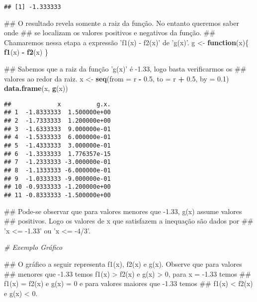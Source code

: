 \documentclass[]{book}
\newenvironment{Shaded}{\begin{snugshade}}{\end{snugshade}}
\newcommand{\KeywordTok}[1]{\textcolor[rgb]{0.13,0.29,0.53}{\textbf{#1}}}
\newcommand{\DataTypeTok}[1]{\textcolor[rgb]{0.13,0.29,0.53}{#1}}
\newcommand{\FloatTok}[1]{\textcolor[rgb]{0.00,0.00,0.81}{#1}}
\newcommand{\StringTok}[1]{\textcolor[rgb]{0.31,0.60,0.02}{#1}}
\newcommand{\CommentTok}[1]{\textcolor[rgb]{0.56,0.35,0.01}{\textit{#1}}}
\newcommand{\ControlFlowTok}[1]{\textcolor[rgb]{0.13,0.29,0.53}{\textbf{#1}}}
\newcommand{\OperatorTok}[1]{\textcolor[rgb]{0.81,0.36,0.00}{\textbf{#1}}}
\newcommand{\NormalTok}[1]{#1}
\begin{document}
\begin{enumerate}
\begin{verbatim}
## [1] -1.333333
\end{verbatim}

\begin{Shaded}
\begin{Highlighting}[]
\NormalTok{##  O resultado revela somente a raiz da função. No entanto queremos saber onde}
\NormalTok{## se localizam os valores positivos e negativos da função.}
\NormalTok{##  Chamaremos nessa etapa a expressão 'f1(x) - f2(x)' de 'g(x)'.}
\NormalTok{g <-}\StringTok{ }\ControlFlowTok{function}\NormalTok{(x)\{}
  \KeywordTok{f1}\NormalTok{(x) }\OperatorTok{-}\StringTok{ }\KeywordTok{f2}\NormalTok{(x)}
\NormalTok{\}}

\NormalTok{##  Sabemos que a raiz da função 'g(x)' é -1.33, logo basta verificarmos os}
\NormalTok{## valores ao redor da raiz.}
\NormalTok{x <-}\StringTok{ }\KeywordTok{seq}\NormalTok{(}\DataTypeTok{from =}\NormalTok{ r }\OperatorTok{-}\StringTok{ }\FloatTok{0.5}\NormalTok{, }\DataTypeTok{to =}\NormalTok{ r }\OperatorTok{+}\StringTok{ }\FloatTok{0.5}\NormalTok{, }\DataTypeTok{by =} \FloatTok{0.1}\NormalTok{)}
\KeywordTok{data.frame}\NormalTok{(x, }\KeywordTok{g}\NormalTok{(x))}
\end{Highlighting}
\end{Shaded}

\begin{verbatim}
##             x          g.x.
## 1  -1.8333333  1.500000e+00
## 2  -1.7333333  1.200000e+00
## 3  -1.6333333  9.000000e-01
## 4  -1.5333333  6.000000e-01
## 5  -1.4333333  3.000000e-01
## 6  -1.3333333  1.776357e-15
## 7  -1.2333333 -3.000000e-01
## 8  -1.1333333 -6.000000e-01
## 9  -1.0333333 -9.000000e-01
## 10 -0.9333333 -1.200000e+00
## 11 -0.8333333 -1.500000e+00
\end{verbatim}

\begin{Shaded}
\begin{Highlighting}[]
\NormalTok{##  Pode-se observar que para valores menores que -1.33, g(x) assume valores}
\NormalTok{## positivos. Logo os valores de x que satisfazem a inequação são dados por}
\NormalTok{## 'x <= -1.33' ou 'x <= -4/3'.}

\CommentTok{# Exemplo Gráfico}

\NormalTok{##  O gráfico a seguir representa f1(x), f2(x) e g(x). Observe que para valores}
\NormalTok{## menores que -1.33 temos f1(x) > f2(x) e g(x) > 0, para x = -1.33 temos}
\NormalTok{## f1(x) = f2(x) e g(x) = 0 e para valores maiores que -1.33 temos}
\NormalTok{## f1(x) < f2(x) e g(x) < 0.}


\end{Highlighting}
\end{Shaded}
\end{enumerate}
\end{document}
